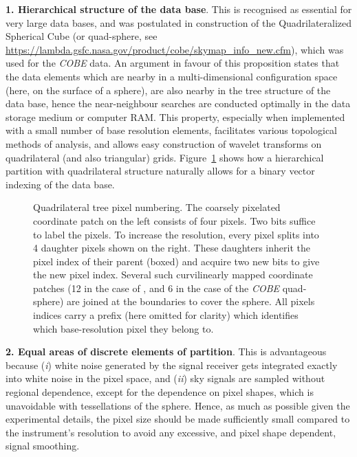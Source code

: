 \documentclass[12pt,twoside]{article}
\begin{document}
\textbf{1. Hierarchical structure of the data base}. This is recognised as 
essential for very large data bases, and was  postulated 
in construction
of the Quadrilateralized Spherical Cube 
(or quad-sphere, see 
\url{https://lambda.gsfc.nasa.gov/product/cobe/skymap_info_new.cfm}),
which was used for the
{\it COBE} data. An  argument in favour of this 
proposition
states that the data elements  
which are nearby in a multi-dimensional configuration space 
(here, on the surface of 
a sphere), are also nearby in the tree structure of the data base, hence
the near-neighbour searches are conducted optimally in the data storage medium
or computer RAM.
This property, especially when implemented with a small number of base
resolution elements, 
facilitates various topological methods of analysis, 
and allows easy construction
of wavelet transforms on quadrilateral (and also triangular) grids. 
Figure~\ref{fig:quadtree} %
shows how a hierarchical partition with 
quadrilateral structure naturally allows for a binary vector indexing
of the data base.

\begin{figure}[!ht]
\caption[Quadrilateral tree pixel numbering]%
{\label{fig:quadtree}%
Quadrilateral tree pixel numbering. 
The coarsely pixelated coordinate patch on
the left consists 
of four pixels. Two bits suffice to label the pixels. 
To increase the resolution, every 
pixel splits into 
4 daughter pixels shown on the right. These daughters inherit the pixel
index of their 
parent (boxed) and acquire 
two new bits to give the new pixel index. 
Several such curvilinearly mapped coordinate patches 
(12 in the case of \healpixns, and 6 in the case of the {\it COBE} quad-sphere) 
are joined at the boundaries to cover
the sphere. All pixels indices carry a prefix (here omitted for clarity) 
which identifies which base-resolution pixel they belong to.}
\end{figure}

\textbf{2. Equal areas of discrete elements of partition}. This is advantageous 
because ({\it i})
white noise generated by the  signal receiver 
gets integrated exactly into
white noise in the pixel space, and 
({\it ii}) sky signals are sampled without regional dependence, except for 
the dependence on pixel shapes, which is unavoidable with tessellations of the 
sphere. 
Hence, as much as possible given the experimental details, the pixel
size should be made sufficiently small compared to the 
instrument's resolution to avoid any excessive, and pixel shape dependent, 
signal smoothing.
\end{document}
